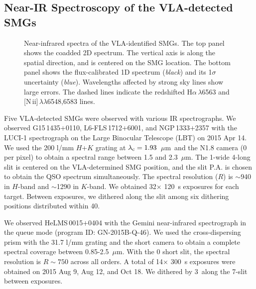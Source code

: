 \documentclass[iop,revtex4,twocolumn,apj,numberedappendix,appendixfloats]{emulateapj}
\newcommand{\um}{$\mu$m}
\newcommand{\Ha}{H$\alpha$}
\newcommand{\NII}{[N\,{\sc ii}]}
\newcommand{\sqp}{SMG$-$QSO pair}
\begin{document}

\subsection{Near-IR Spectroscopy of the VLA-detected SMGs} 

\begin{figure*}[!tb]
\caption{Near-infrared spectra of the VLA-identified SMGs. The top panel shows the coadded 2D spectrum. The vertical axis is along the spatial direction, and is centered on the SMG location. The bottom panel shows the flux-calibrated 1D spectrum ({\it black}) and its 1$\sigma$ uncertainty ({\it blue}). Wavelengths affected by strong sky lines show large errors. The dashed lines indicate the redshifted \Ha\,$\lambda$6563 and \NII\,$\lambda\lambda$6548,6583 lines.
\label{fig:smgspec}} 
\end{figure*}

Five VLA-detected SMGs were observed with various IR spectrographs. 
%
We observed G15\,1435$+$0110, L6-FLS\,1712$+$6001, and NGP\,1333$+$2357 with the LUCI-1
spectrograph \citep{Seifert03} on the Large Binocular Telescope (LBT) on 2015 Apr 14. We used the 200 l/mm $H$+$K$ grating at $\lambda_{\rm c} = 1.93$~\um\ and the N1.8 camera (0 per pixel) to obtain a spectral range between 1.5 and 2.3~\um. The 1\arcsec-wide 4\arcmin-long slit is centered on the VLA-determined SMG position, and the slit P.A. is chosen to obtain the QSO spectrum simultaneously. The spectral resolution ($R$) is $\sim$940 in $H$-band and $\sim$1290 in $K$-band. We obtained 32$\times$ 120~s exposures for each target. Between exposures, we dithered along the slit among six dithering positions distributed within 40\arcsec. 

We observed HeLMS\,0015$+$0404 with the Gemini near-infrared spectrograph \citep[GNIRS;][]{Elias06} in the queue mode (program ID: GN-2015B-Q-46). We used the cross-dispersing prism with the 31.7 l/mm grating and the short camera to obtain a complete spectral coverage between 0.85-2.5~\um. With the 0 short slit, the spectral resolution is $R \sim 750$ across all orders. A total of 14$\times$ 300~s exposures were obtained on 2015 Aug 9, Aug 12, and Oct 18. We dithered by 3\arcsec\ along the 7\arcsec-slit between exposures.
\end{document}
